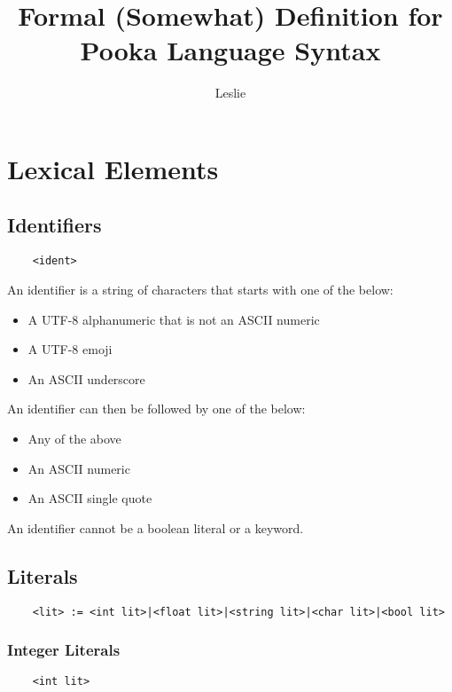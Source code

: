 \documentclass[a4paper]{article}
\title{Formal (Somewhat) Definition for Pooka Language Syntax}
\author{Leslie}
\begin{document}
\maketitle

\section{Lexical Elements}

\subsection{Identifiers}

\begin{verbatim}
    <ident>
\end{verbatim}

An identifier is a string of characters that starts with one of the below:

\begin{itemize}
    \item A UTF-8 alphanumeric that is not an ASCII numeric
    \item A UTF-8 emoji
    \item An ASCII underscore
\end{itemize}

An identifier can then be followed by one of the below:

\begin{itemize}
    \item Any of the above
    \item An ASCII numeric
    \item An ASCII single quote
\end{itemize}

An identifier cannot be a boolean literal or a keyword.

\subsection{Literals}

\begin{verbatim}
    <lit> := <int lit>|<float lit>|<string lit>|<char lit>|<bool lit>
\end{verbatim}

\subsubsection{Integer Literals}

\begin{verbatim}
    <int lit>
\end{verbatim}
\end{document}
